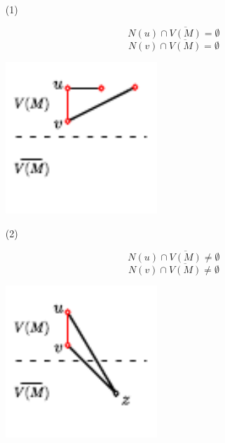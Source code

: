 \documentclass[notitlepage, 12pt]{article}
\begin{document}
\begin{itemize}
\item[(1)] 
\begin{minipage}{.5\textwidth}
  \[
    N(u) \cap \overline{V(M)} = \emptyset
  \]
  \[
    N(v) \cap \overline{V(M)} = \emptyset
  \]
\end{minipage}%
\begin{minipage}{.5\textwidth}
  \includegraphics[width=0.45\textwidth]{max-matching-structure-1.pdf}
  \centering
\end{minipage}

\item[(2)] 
\begin{minipage}{.5\textwidth}
  \[
    N(u) \cap \overline{V(M)} \neq \emptyset
  \]
  \[
    N(v) \cap \overline{V(M)} \neq \emptyset
  \]
\end{minipage}%
\begin{minipage}{.5\textwidth}
  \includegraphics[width=0.45\textwidth]{max-matching-structure-2.pdf}
  \centering
\end{minipage}


\end{itemize}
\end{document}
